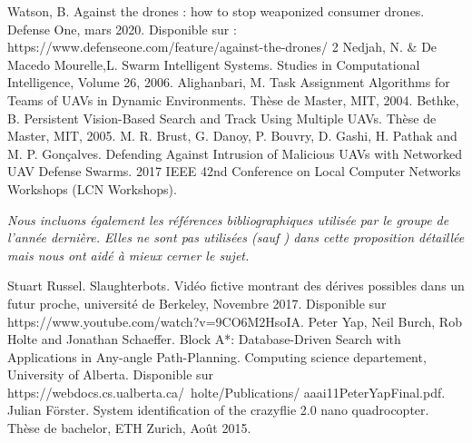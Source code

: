 \documentclass[12pt, openany]{article}
\begin{document}
\newpage
\begin{thebibliography}{9}
Watson, B. Against the drones : how to stop weaponized consumer drones. Defense One, mars 2020. Disponible sur : https://www.defenseone.com/feature/against-the-drones/
2 
Nedjah, N. & De Macedo Mourelle,L. Swarm Intelligent Systems. Studies in Computational Intelligence, Volume 26, 2006.
Alighanbari, M. Task Assignment Algorithms for Teams of UAVs in Dynamic Environments. Thèse de Master, MIT, 2004.
Bethke, B. Persistent Vision-Based Search and Track Using Multiple UAVs. Thèse de Master, MIT, 2005.
M. R. Brust, G. Danoy, P. Bouvry, D. Gashi, H. Pathak and M. P. Gonçalves. Defending Against Intrusion of Malicious UAVs with Networked UAV Defense Swarms. 2017 IEEE 42nd Conference on Local Computer Networks Workshops (LCN Workshops).

\vspace{1cm}
\textit{Nous incluons également les références bibliographiques utilisée par le groupe de l'année dernière. Elles ne sont pas utilisées (sauf \cite{4}) dans cette proposition détaillée mais nous ont aidé à mieux cerner le sujet.}

Stuart Russel. Slaughterbots. Vidéo fictive montrant des dérives
possibles dans un futur proche, université de Berkeley, Novembre 2017.
Disponible sur
https://www.youtube.com/watch?v=9CO6M2HsoIA.
Peter Yap, Neil Burch, Rob Holte and Jonathan Schaeffer. Block A*: Database-Driven Search with Applications in Any-angle Path-Planning. Computing science departement, University of Alberta. Disponible sur
https://webdocs.cs.ualberta.ca/~holte/Publications/
aaai11PeterYapFinal.pdf.
Julian Förster. System identification of the crazyflie 2.0 nano quadrocopter. Thèse de bachelor, ETH Zurich, Août 2015.


\end{thebibliography}
\end{document}
